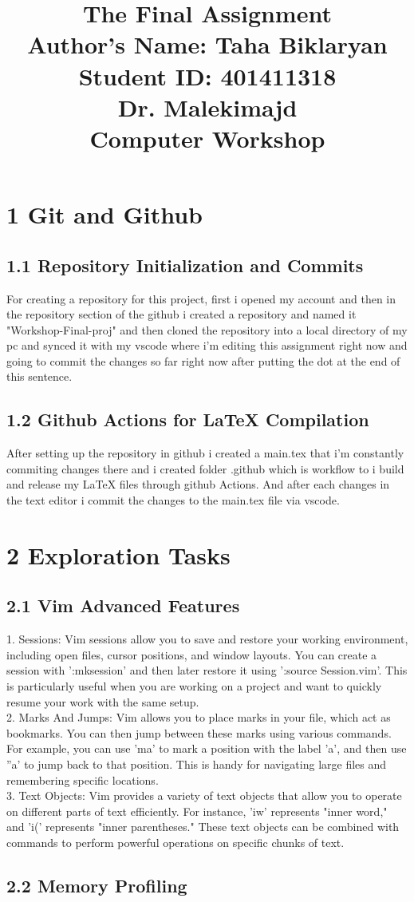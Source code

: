 \documentclass{article}
\title{\Huge The Final Assignment \\[1cm]
\Large Author's Name: Taha Biklaryan \\[0.5cm]
\large Student ID: 401411318 \\[1cm]  
\large Dr. Malekimajd \\[1cm]
\large Computer Workshop}
\date{} %
\begin{document}
\maketitle
\newpage
\section*{\Huge 1 Git and Github}
\subsection*{\Large 1.1 Repository Initialization and Commits}
For creating a repository for this project, first i opened my account and then in the repository section of the github i created a repository and named it "Workshop-Final-proj" and then 
cloned the repository into a local directory of my pc and synced it with my vscode where i'm editing this assignment right now and going to commit the changes so far right now after putting the dot
at the end of this sentence.\\
\subsection*{\large 1.2 Github Actions for LaTeX Compilation}
After setting up the repository in github i created a main.tex that i'm constantly commiting changes there
and i created folder .github which is workflow to i build and release my LaTeX files through github Actions.
And after each changes in the text editor i commit the changes to the main.tex file via vscode.\\


\section*{\Huge 2 Exploration Tasks}
\subsection*{\large 2.1 Vim Advanced Features}
1. Sessions:
Vim sessions allow you to save and restore your working environment, including open files, cursor positions, and window layouts. You can create a session with ':mksession' and then later restore it using ':source Session.vim'. This is particularly useful when you are working on a project and want to quickly resume your work with the same setup.\\
2. Marks And Jumps:
Vim allows you to place marks in your file, which act as bookmarks. You can then jump between these marks using various commands. For example, you can use 'ma' to mark a position with the label 'a', and then use ''a' to jump back to that position. This is handy for navigating large files and remembering specific locations.\\
3. Text Objects:
Vim provides a variety of text objects that allow you to operate on different parts of text efficiently. For instance, 'iw' represents "inner word," and 'i(' represents "inner parentheses." These text objects can be combined with commands to perform powerful operations on specific chunks of text.\\
\subsection*{\large 2.2 Memory Profiling}
\end{document}
